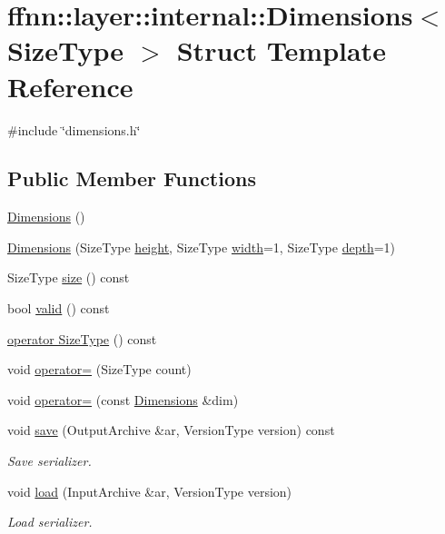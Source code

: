 \hypertarget{structffnn_1_1layer_1_1internal_1_1_dimensions}{\section{ffnn\-:\-:layer\-:\-:internal\-:\-:Dimensions$<$ Size\-Type $>$ Struct Template Reference}
\label{structffnn_1_1layer_1_1internal_1_1_dimensions}
}


{\ttfamily \#include \char`\"{}dimensions.\-h\char`\"{}}

\subsection*{Public Member Functions}
\begin{DoxyCompactItemize}
\item 
\hyperlink{structffnn_1_1layer_1_1internal_1_1_dimensions_a44dfec485cbd9d3dc95ddd38319b1829}{Dimensions} ()
\item 
\hyperlink{structffnn_1_1layer_1_1internal_1_1_dimensions_a6c07d0cdfc92bb13c34a1712c1e9f58b}{Dimensions} (Size\-Type \hyperlink{structffnn_1_1layer_1_1internal_1_1_dimensions_a49348c4b65a649c9d55284e283bfa39e}{height}, Size\-Type \hyperlink{structffnn_1_1layer_1_1internal_1_1_dimensions_a1fac884bf9c7468e9408143195afc989}{width}=1, Size\-Type \hyperlink{structffnn_1_1layer_1_1internal_1_1_dimensions_a34216373e9d09bb79b05a90ef9cec53b}{depth}=1)
\item 
Size\-Type \hyperlink{structffnn_1_1layer_1_1internal_1_1_dimensions_a55225c7e571ffb20efc454767bc598e1}{size} () const 
\item 
bool \hyperlink{structffnn_1_1layer_1_1internal_1_1_dimensions_a62d2fa9411f32b8d2f3a197cf202ec53}{valid} () const 
\item 
\hyperlink{structffnn_1_1layer_1_1internal_1_1_dimensions_a9f9e33a5d3c0e148f394364ca61e2b66}{operator Size\-Type} () const 
\item 
void \hyperlink{structffnn_1_1layer_1_1internal_1_1_dimensions_aca4f4f99d5943256d7a4c66543839cb2}{operator=} (Size\-Type count)
\item 
void \hyperlink{structffnn_1_1layer_1_1internal_1_1_dimensions_a7c62d6ad721cbdaf3352e63c0541df48}{operator=} (const \hyperlink{structffnn_1_1layer_1_1internal_1_1_dimensions}{Dimensions} \&dim)
\item 
void \hyperlink{structffnn_1_1layer_1_1internal_1_1_dimensions_a7516722990cfea99e376f41fb95847cb}{save} (Output\-Archive \&ar, Version\-Type version) const 
\begin{DoxyCompactList}\small\item\em Save serializer. \end{DoxyCompactList}\item 
void \hyperlink{structffnn_1_1layer_1_1internal_1_1_dimensions_af342e32d3de83adb90abfb35991d8d32}{load} (Input\-Archive \&ar, Version\-Type version)
\begin{DoxyCompactList}\small\item\em Load serializer. \end{DoxyCompactList}\end{DoxyCompactItemize}
